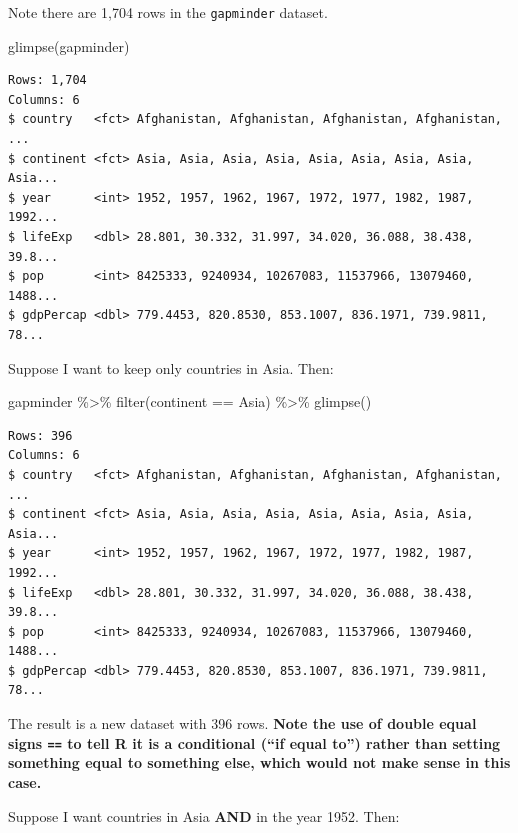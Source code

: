 \documentclass[
]{book}
\makeatletter
\newenvironment{Shaded}{\begin{snugshade}}{\end{snugshade}}
\newcommand{\FunctionTok}[1]{\textcolor[rgb]{0,0,0}{#1}}
\newcommand{\NormalTok}[1]{#1}
\newcommand{\SpecialCharTok}[1]{\textcolor[rgb]{0,0,0}{#1}}
\newcommand{\StringTok}[1]{\textcolor[rgb]{0.5,0.5,0.5}{#1}}
\newenvironment{kframe}{%
\medskip{}
\setlength{\fboxsep}{.8em}
 \def\at@end@of@kframe{}%
 \ifinner\ifhmode%
  \def\at@end@of@kframe{\end{minipage}}%
  \begin{minipage}{\columnwidth}%
 \fi\fi%
 \def\FrameCommand##1{\hskip\@totalleftmargin \hskip-\fboxsep
 \colorbox{shadecolor}{##1}\hskip-\fboxsep
     \hskip-\linewidth \hskip-\@totalleftmargin \hskip\columnwidth}%
 \MakeFramed {\advance\hsize-\width
   \@totalleftmargin\z@ \linewidth\hsize
   \@setminipage}}%
 {\par\unskip\endMakeFramed%
 \at@end@of@kframe}
\renewenvironment{Shaded}{\begin{kframe}}{\end{kframe}}
\makeatother
\begin{document}
Note there are 1,704 rows in the \texttt{gapminder} dataset.

\begin{Shaded}
\begin{Highlighting}[]
\FunctionTok{glimpse}\NormalTok{(gapminder)}
\end{Highlighting}
\end{Shaded}

\begin{verbatim}
Rows: 1,704
Columns: 6
$ country   <fct> Afghanistan, Afghanistan, Afghanistan, Afghanistan, ...
$ continent <fct> Asia, Asia, Asia, Asia, Asia, Asia, Asia, Asia, Asia...
$ year      <int> 1952, 1957, 1962, 1967, 1972, 1977, 1982, 1987, 1992...
$ lifeExp   <dbl> 28.801, 30.332, 31.997, 34.020, 36.088, 38.438, 39.8...
$ pop       <int> 8425333, 9240934, 10267083, 11537966, 13079460, 1488...
$ gdpPercap <dbl> 779.4453, 820.8530, 853.1007, 836.1971, 739.9811, 78...
\end{verbatim}

Suppose I want to keep only countries in Asia. Then:

\begin{Shaded}
\begin{Highlighting}[]
\NormalTok{gapminder }\SpecialCharTok{\%\textgreater{}\%} 
  \FunctionTok{filter}\NormalTok{(continent }\SpecialCharTok{==} \StringTok{\textquotesingle{}Asia\textquotesingle{}}\NormalTok{) }\SpecialCharTok{\%\textgreater{}\%} 
  \FunctionTok{glimpse}\NormalTok{()}
\end{Highlighting}
\end{Shaded}

\begin{verbatim}
Rows: 396
Columns: 6
$ country   <fct> Afghanistan, Afghanistan, Afghanistan, Afghanistan, ...
$ continent <fct> Asia, Asia, Asia, Asia, Asia, Asia, Asia, Asia, Asia...
$ year      <int> 1952, 1957, 1962, 1967, 1972, 1977, 1982, 1987, 1992...
$ lifeExp   <dbl> 28.801, 30.332, 31.997, 34.020, 36.088, 38.438, 39.8...
$ pop       <int> 8425333, 9240934, 10267083, 11537966, 13079460, 1488...
$ gdpPercap <dbl> 779.4453, 820.8530, 853.1007, 836.1971, 739.9811, 78...
\end{verbatim}

The result is a new dataset with 396 rows. \textbf{Note the use of double equal signs \texttt{==} to tell R it is a conditional (``if equal to'') rather than setting something equal to something else, which would not make sense in this case.}

Suppose I want countries in Asia \textbf{AND} in the year 1952. Then:
\end{document}
